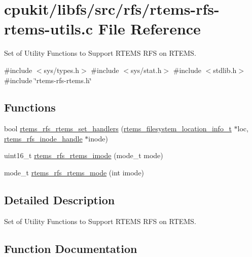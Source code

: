 \hypertarget{rtems-rfs-rtems-utils_8c}{}\section{cpukit/libfs/src/rfs/rtems-\/rfs-\/rtems-\/utils.c File Reference}
\label{rtems-rfs-rtems-utils_8c}


Set of Utility Functions to Support R\+T\+E\+MS R\+FS on R\+T\+E\+MS.  


{\ttfamily \#include $<$sys/types.\+h$>$}\newline
{\ttfamily \#include $<$sys/stat.\+h$>$}\newline
{\ttfamily \#include $<$stdlib.\+h$>$}\newline
{\ttfamily \#include \char`\"{}rtems-\/rfs-\/rtems.\+h\char`\"{}}\newline
\subsection*{Functions}
\begin{DoxyCompactItemize}
\item 
bool \mbox{\hyperlink{rtems-rfs-rtems-utils_8c_a259ad09e94606e05bbc93775420ba21f}{rtems\+\_\+rfs\+\_\+rtems\+\_\+set\+\_\+handlers}} (\mbox{\hyperlink{group__LibIO_ga3252b3d31ee3c49ffff0b7604a676864}{rtems\+\_\+filesystem\+\_\+location\+\_\+info\+\_\+t}} $\ast$loc, \mbox{\hyperlink{rtems-rfs-inode_8h_a91f02dac5a2d91e072d676f3266ab8d2}{rtems\+\_\+rfs\+\_\+inode\+\_\+handle}} $\ast$inode)
\item 
uint16\+\_\+t \mbox{\hyperlink{rtems-rfs-rtems-utils_8c_a1ed03f3bced418219d0c658d8dce5e7a}{rtems\+\_\+rfs\+\_\+rtems\+\_\+imode}} (mode\+\_\+t mode)
\item 
mode\+\_\+t \mbox{\hyperlink{rtems-rfs-rtems-utils_8c_aff5423998d0f78a1caecd4acff199690}{rtems\+\_\+rfs\+\_\+rtems\+\_\+mode}} (int imode)
\end{DoxyCompactItemize}


\subsection{Detailed Description}
Set of Utility Functions to Support R\+T\+E\+MS R\+FS on R\+T\+E\+MS. 



\subsection{Function Documentation}
\mbox{\label{rtems-rfs-rtems-utils_8c_a1ed03f3bced418219d0c658d8dce5e7a}} 
